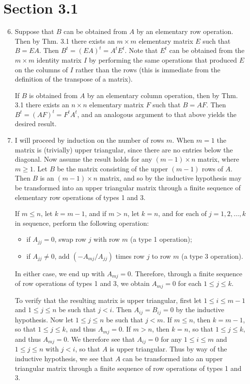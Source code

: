 \documentclass[12pt]{article}
\begin{document}
\section*{Section 3.1}

\begin{enumerate}
\setcounter{enumi}{5}
\item
Suppose that $B$ can be obtained from $A$ by an elementary row operation. Then by Thm. 3.1 there exists an $m \times m$ elementary matrix $E$ such that $B = EA$. Then $B^t = (EA)^t = A^tE^t$. Note that $E^t$ can be obtained from the $m \times m$ identity matrix $I$ by performing the same operations that produced $E$ on the columns of $I$ rather than the rows (this is immediate from the definition of the transpose of a matrix).

If $B$ is obtained from $A$ by an elementary column operation, then by Thm. 3.1 there exists an $n \times n$ elementary matrix $F$ such that $B = AF$. Then $B^t = (AF)^t = F^tA^t$, and an analogous argument to that above yields the desired result.

\setcounter{enumi}{11}
\item
I will proceed by induction on the number of rows $m$. When $m=1$ the matrix is (trivially) upper triangular, since there are no entries below the diagonal. Now assume the result holds for any $(m-1) \times n$ matrix, where $m \geq 1$. Let $B$ be the matrix consisting of the upper $(m-1)$ rows of $A$. Then $B$ is an $(m-1) \times n$ matrix, and so by the inductive hypothesis may be transformed into an upper triangular matrix through a finite sequence of elementary row operations of types 1 and 3.

If $m \leq n$, let $k = m-1$, and if $m > n$, let $k = n$, and for each of $j = 1, 2, \dots, k$ in sequence, perform the following operation:
\begin{itemize}
\item
if $A_{jj} = 0$, swap row $j$ with row $m$ (a type 1 operation);
\item
if $A_{jj} \neq 0$, add $(-A_{mj}/A_{jj})$ times row $j$ to row $m$ (a type 3 operation).
\end{itemize}
In either case, we end up with $A_{mj} = 0$. Therefore, through a finite sequence of row operations of types 1 and 3, we obtain $A_{mj} = 0$ for each $1 \leq j \leq k$.

To verify that the resulting matrix is upper triangular, first let $1 \leq i \leq m-1$ and $1 \leq j \leq n$ be such that $j < i$. Then $A_{ij} = B_{ij} = 0$ by the inductive hypothesis. Now let $1 \leq j \leq n$ be such that $j < m$. If $m \leq n$, then $k = m-1$, so that $1 \leq j \leq k$, and thus $A_{mj} = 0$. If $m > n$, then $k = n$, so that $1 \leq j \leq k$, and thus $A_{mj} = 0$. We therefore see that $A_{ij} = 0$ for any $1 \leq i \leq m$ and $1 \leq j \leq n$ with $j < i$, so that $A$ is upper triangular. Thus by way of the inductive hypothesis, we see that $A$ can be transformed into an upper triangular matrix through a finite sequence of row operations of types 1 and 3.

\end{enumerate}
\end{document}

